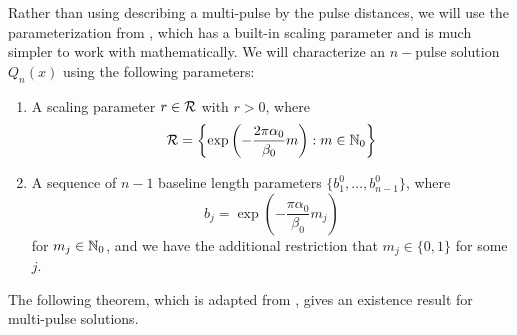 \documentclass[thesis.tex]{subfiles}
\begin{document}
Rather than using describing a multi-pulse by the pulse distances, we will use the parameterization from \cite{SandstedeStrut}, which has a built-in scaling parameter and is much simpler to work with mathematically. We will characterize an $n-$pulse solution $Q_n(x)$ using the following parameters:
\begin{enumerate}
\item A scaling parameter $r \in \mathcal{R}$ with $r > 0$, where
\[
\mathcal{R} = \left\{ \mathop\mathrm{exp}\nolimits\left(-\frac{2 \pi \alpha_0}{\beta_0}m \right) : m \in \mathbb{N}_0 \right\}
\]
\item A sequence of $n-1$ baseline length parameters $\{ b_1^0, \dots, b_{n-1}^0 \}$, where 
\[
b_j = \exp\left(-\frac{\pi \alpha_0}{\beta_0}m_j \right)
\]
for $m_j \in \mathbb{N}_0$, and we have the additional restriction that $m_j \in \{0, 1\}$ for some $j$.
\end{enumerate}

The following theorem, which is adapted from \cite[Theorem 3.6]{SandstedeStrut}, gives an existence result for multi-pulse solutions.
\end{document}
